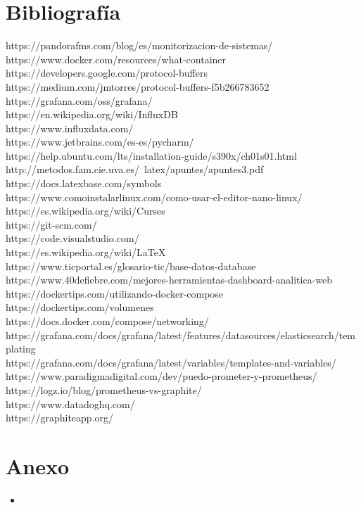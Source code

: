 \documentclass[ spanish, a4paper, 12pt, oneside]{report}
\begin{document}
\chapter{Bibliografía}
https://pandorafms.com/blog/es/monitorizacion-de-sistemas/ \\
https://www.docker.com/resources/what-container \\
https://developers.google.com/protocol-buffers \\
https://medium.com/jmtorres/protocol-buffers-f5b266783652 \\
https://grafana.com/oss/grafana/ \\
https://en.wikipedia.org/wiki/InfluxDB \\
https://www.influxdata.com/ \\
https://www.jetbrains.com/es-es/pycharm/ \\
https://help.ubuntu.com/lts/installation-guide/s390x/ch01s01.html \\
http://metodos.fam.cie.uva.es/~latex/apuntes/apuntes3.pdf \\
https://docs.latexbase.com/symbols \\
https://www.comoinstalarlinux.com/como-usar-el-editor-nano-linux/\\
https://es.wikipedia.org/wiki/Curses \\
https://git-scm.com/ \\
https://code.visualstudio.com/ \\
https://es.wikipedia.org/wiki/LaTeX \\
https://www.ticportal.es/glosario-tic/base-datos-database \\
https://www.40defiebre.com/mejores-herramientas-dashboard-analitica-web \\
https://dockertips.com/utilizando-docker-compose \\
https://dockertips.com/volumenes \\
https://docs.docker.com/compose/networking/ \\
https://grafana.com/docs/grafana/latest/features/datasources/elasticsearch/templating \\
https://grafana.com/docs/grafana/latest/variables/templates-and-variables/ \\
https://www.paradigmadigital.com/dev/puedo-prometer-y-prometheus/ \\
https://logz.io/blog/prometheus-vs-graphite/ \\
https://www.datadoghq.com/ \\
https://graphiteapp.org/ \\

\chapter{Anexo}

\begin{itemize}
   \item 
\end{itemize}
\end{document}
